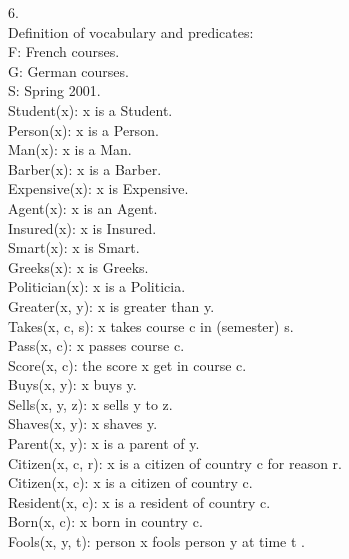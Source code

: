 \documentclass[a4paper]{article}
\begin{document}
\begin{enumerate}[1.]
6.\\
Definition of vocabulary and predicates:\\
F: French courses.\\
G: German courses.\\
S: Spring 2001.\\
Student(x): x is a Student.\\
Person(x): x is a Person.\\
Man(x): x is a Man.\\
Barber(x): x is a Barber.\\
Expensive(x): x is Expensive.\\
Agent(x): x is an Agent.\\
Insured(x): x is Insured.\\
Smart(x): x is Smart.\\
Greeks(x): x is Greeks.\\
Politician(x): x is a Politicia.\\
Greater(x, y): x is greater than y.\\
Takes(x, c, s): x takes course c in (semester) s.\\
Pass(x, c): x passes course c.\\
Score(x, c):  the score x get in course c.\\
Buys(x, y): x buys y.\\
Sells(x, y, z): x sells y to z.\\
Shaves(x, y): x shaves y.\\
Parent(x, y): x is a parent of y.\\
Citizen(x, c, r): x is a citizen of country c for reason r.\\
Citizen(x, c): x is a citizen of country c.\\
Resident(x, c): x is a resident of country c.\\
Born(x, c): x born in country c.\\
Fools(x, y, t): person x fools person y at time t .\\


\end{enumerate}
\end{document}
